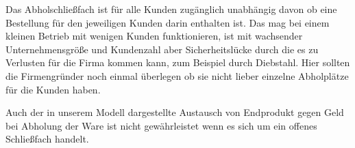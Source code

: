 \documentclass[12pt,a4paper]{../krautsourcing/homework}
\begin{document}
Das Abholschließfach ist für alle Kunden zugänglich unabhängig davon ob eine Bestellung für den jeweiligen Kunden darin enthalten ist. Das mag bei einem kleinen Betrieb mit wenigen Kunden funktionieren, ist mit wachsender Unternehmensgröße und Kundenzahl aber Sicherheitslücke durch die es zu Verlusten für die Firma kommen kann, zum Beispiel durch Diebstahl. Hier sollten die Firmengründer noch einmal überlegen ob sie nicht lieber einzelne Abholplätze für die Kunden haben.

Auch der in unserem Modell dargestellte Austausch von Endprodukt gegen Geld bei Abholung der Ware ist nicht gewährleistet wenn es sich um ein offenes Schließfach handelt.
\end{document}
